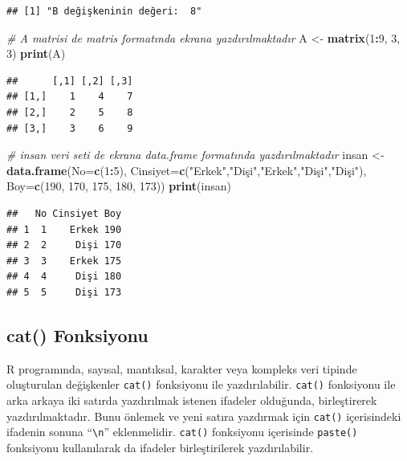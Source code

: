 \documentclass[
]{book}
\newenvironment{Shaded}{\begin{snugshade}}{\end{snugshade}}
\newcommand{\AttributeTok}[1]{\textcolor[rgb]{0.13,0.29,0.53}{#1}}
\newcommand{\CommentTok}[1]{\textcolor[rgb]{0.56,0.35,0.01}{\textit{#1}}}
\newcommand{\DecValTok}[1]{\textcolor[rgb]{0.00,0.00,0.81}{#1}}
\newcommand{\FunctionTok}[1]{\textcolor[rgb]{0.13,0.29,0.53}{\textbf{#1}}}
\newcommand{\NormalTok}[1]{#1}
\newcommand{\OtherTok}[1]{\textcolor[rgb]{0.56,0.35,0.01}{#1}}
\newcommand{\SpecialCharTok}[1]{\textcolor[rgb]{0.81,0.36,0.00}{\textbf{#1}}}
\newcommand{\StringTok}[1]{\textcolor[rgb]{0.31,0.60,0.02}{#1}}
\begin{document}
\begin{verbatim}
## [1] "B değişkeninin değeri:  8"
\end{verbatim}

\begin{Shaded}
\begin{Highlighting}[]
\CommentTok{\# A matrisi de matris formatında ekrana yazdırılmaktadır}
\NormalTok{A }\OtherTok{\textless{}{-}} \FunctionTok{matrix}\NormalTok{(}\DecValTok{1}\SpecialCharTok{:}\DecValTok{9}\NormalTok{, }\DecValTok{3}\NormalTok{, }\DecValTok{3}\NormalTok{)}
\FunctionTok{print}\NormalTok{(A)}
\end{Highlighting}
\end{Shaded}

\begin{verbatim}
##      [,1] [,2] [,3]
## [1,]    1    4    7
## [2,]    2    5    8
## [3,]    3    6    9
\end{verbatim}

\begin{Shaded}
\begin{Highlighting}[]
\CommentTok{\# insan veri seti de ekrana data.frame formatında yazdırılmaktadır}
\NormalTok{insan }\OtherTok{\textless{}{-}} \FunctionTok{data.frame}\NormalTok{(}\AttributeTok{No=}\FunctionTok{c}\NormalTok{(}\DecValTok{1}\SpecialCharTok{:}\DecValTok{5}\NormalTok{), }
                    \AttributeTok{Cinsiyet=}\FunctionTok{c}\NormalTok{(}\StringTok{"Erkek"}\NormalTok{,}\StringTok{"Dişi"}\NormalTok{,}\StringTok{"Erkek"}\NormalTok{,}\StringTok{"Dişi"}\NormalTok{,}\StringTok{"Dişi"}\NormalTok{),}
                    \AttributeTok{Boy=}\FunctionTok{c}\NormalTok{(}\DecValTok{190}\NormalTok{, }\DecValTok{170}\NormalTok{, }\DecValTok{175}\NormalTok{, }\DecValTok{180}\NormalTok{, }\DecValTok{173}\NormalTok{))}
\FunctionTok{print}\NormalTok{(insan)}
\end{Highlighting}
\end{Shaded}

\begin{verbatim}
##   No Cinsiyet Boy
## 1  1    Erkek 190
## 2  2     Dişi 170
## 3  3    Erkek 175
## 4  4     Dişi 180
## 5  5     Dişi 173
\end{verbatim}

\subsection{cat() Fonksiyonu}\label{cat-fonksiyonu}

R programında, sayısal, mantıksal, karakter veya kompleks veri tipinde oluşturulan değişkenler \texttt{cat()} fonksiyonu ile yazdırılabilir. \texttt{cat()} fonksiyonu ile arka arkaya iki satırda yazdırılmak istenen ifadeler olduğunda, birleştirerek yazdırılmaktadır. Bunu önlemek ve yeni satıra yazdırmak için \texttt{cat()} içerisindeki ifadenin sonuna ``\texttt{\textbackslash{}n}'' eklenmelidir. \texttt{cat()} fonksiyonu içerisinde \texttt{paste()} fonksiyonu kullanılarak da ifadeler birleştirilerek yazdırılabilir.
\end{document}

